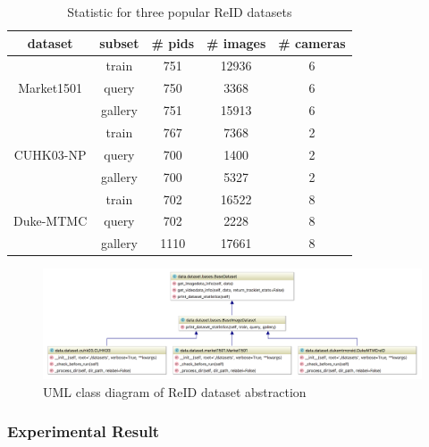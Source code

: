 \begin{table}
    \begin{center}
        \begin{tabular}{||c c c c c||}
            \hline
            dataset & subset & \# pids & \# images & \# cameras \\ [0.5ex]
            \hline\hline
            \multirow{3}{4em}{{\tiny Market1501}} & train & 751 & 12936 & 6 \\
            & query & 750 & 3368 & 6 \\
            & gallery & 751 & 15913 & 6 \\
            \hline
            \multirow{3}{4em}{{\tiny CUHK03-NP}} & train & 767 & 7368 & 2 \\
            & query & 700 & 1400 & 2 \\
            & gallery & 700 & 5327 & 2 \\
            \hline
            \multirow{3}{4em}{{\tiny Duke-MTMC}} & train & 702 & 16522 & 8 \\
            & query & 702 & 2228 & 8 \\
            & gallery & 1110 & 17661 & 8 \\
            \hline
        \end{tabular}
    \end{center}
    \caption{Statistic for three popular ReID datasets}
    \label{tab:reid-dataset}
\end{table}

\begin{figure}
    \includegraphics[width=\linewidth]{figures/framework_reid_dataset_uml.png}
    \caption{UML class  diagram of ReID dataset abstraction}
    \label{fig:fw-reid-dataset-uml}
\end{figure}

\subsubsection{Experimental Result}
\label{sec:Eval-reid-result}

